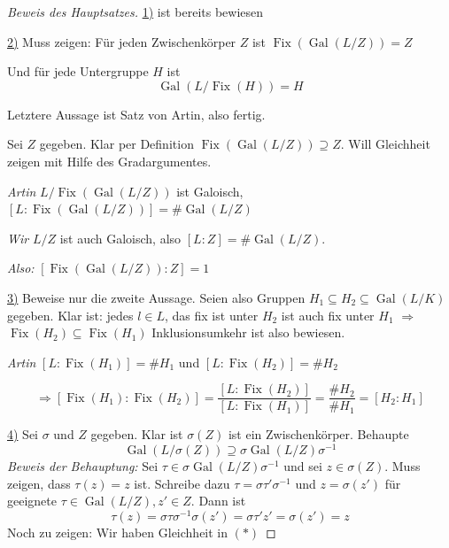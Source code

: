 \documentclass[12pt,parskip=full]{scrartcl}
\newcommand{\heading}{\underline}
\DeclareMathOperator{\Gal}{Gal}
\theoremstyle{definition}
\theoremstyle{remark}
\begin{document}
	\begin{proof}[Beweis des Hauptsatzes]
		\heading{1)} ist bereits bewiesen
		
		\heading{2)} Muss zeigen: Für jeden Zwischenkörper $Z$ ist $\operatorname{Fix}(\Gal(L/Z)) = Z$
		
		Und für jede Untergruppe $H$ ist
		\begin{equation*}
			\Gal(L/\operatorname{Fix}(H)) = H
		\end{equation*}
		
		Letztere Aussage ist Satz von Artin, also fertig.
		
		Sei $Z$ gegeben. Klar per Definition $\operatorname{Fix}(\Gal(L/Z)) \supseteq Z$. Will Gleichheit zeigen mit Hilfe des Gradargumentes.
		
		\textit{Artin} $L/\operatorname{Fix}(\Gal(L/Z))$ ist Galoisch, $[L: \operatorname{Fix}(\Gal(L/Z))] = \#\Gal(L/Z)$
		
		\textit{Wir} $L/Z$ ist auch Galoisch, also $[L:Z] = \#\Gal(L/Z)$.
		
		\textit{Also:} $[\operatorname{Fix}(\Gal(L/Z)): Z] = 1$
		
		\heading{3)} Beweise nur die zweite Aussage. Seien also Gruppen $H_1 \subseteq H_2 \subseteq \Gal(L/K)$ gegeben. Klar ist: jedes $l \in L$, das fix ist unter $H_2$ ist auch fix unter $H_1$ $\Rightarrow$ $\operatorname{Fix}(H_2) \subseteq \operatorname{Fix}(H_1)$ Inklusionsumkehr ist also bewiesen.
		
		\textit{Artin} $[L: \operatorname{Fix}(H_1)] = \#H_1$ und $[L: \operatorname{Fix}(H_2)] = \#H_2$
		
		\begin{equation*}
			\Rightarrow [\operatorname{Fix}(H_1): \operatorname{Fix}(H_2)] = \frac{[L: \operatorname{Fix}(H_2)]}{[L: \operatorname{Fix}(H_1)]} = \frac{\#H_2}{\#H_1} = [H_2: H_1]
		\end{equation*}
		
		\heading{4)} Sei $\sigma$ und $Z$ gegeben. Klar ist $\sigma(Z)$ ist ein Zwischenkörper. Behaupte
		\begin{equation*}
			\Gal(L/\sigma(Z)) \supseteq \sigma \Gal(L/Z) \sigma^{-1} \tag{$*$}
		\end{equation*}
		\textit{Beweis der Behauptung:} Sei $\tau \in \sigma \Gal(L/Z) \sigma^{-1}$ und sei $z \in \sigma(Z)$. Muss zeigen, dass $\tau(z) = z$ ist. Schreibe dazu $\tau = \sigma \tau' \sigma^{-1}$ und $z = \sigma(z')$ für geeignete $\tau \in \Gal(L/Z), z' \in Z$. Dann ist
		\begin{equation*}
			\tau(z) = \sigma \tau \sigma^{-1} \sigma(z') = \sigma \tau' z' = \sigma(z') = z
		\end{equation*}
		Noch zu zeigen: Wir haben Gleichheit in $(*)$
		

\end{proof}
\end{document}
